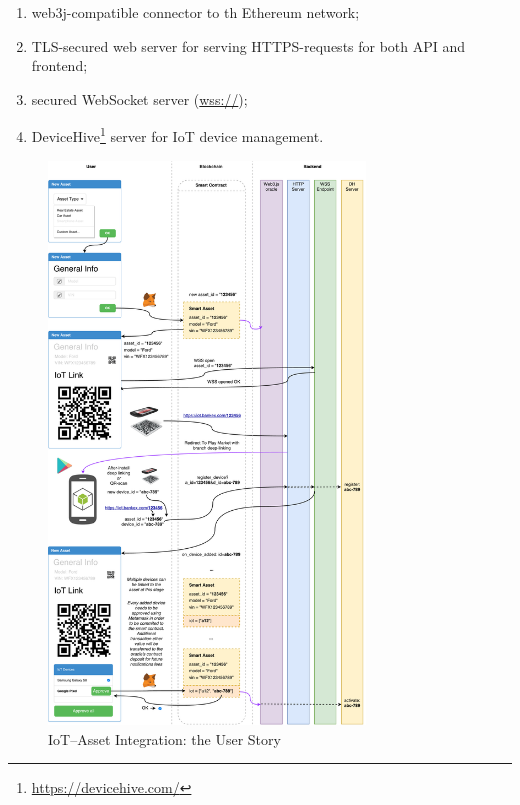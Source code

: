 \documentclass{article}
\begin{document}
\begin{multicols}{2}
\begin{enumerate}
\item web3j-compatible connector to th Ethereum network;
\item TLS-secured web server for serving HTTPS-requests for both API and frontend;
\item secured WebSocket server (\url{wss://});
\item DeviceHive\footnote{\url{https://devicehive.com/}} server for IoT device management.
\end{enumerate}

\begin{figure}
  \centering
  \includegraphics[width=0.75\textwidth]{iot-user-story.pdf}
  \caption{IoT--Asset Integration: the User Story}
  \label{fig:iot-user-story}
\end{figure}

\end{multicols}

\newpage
\appendix
\end{document}
